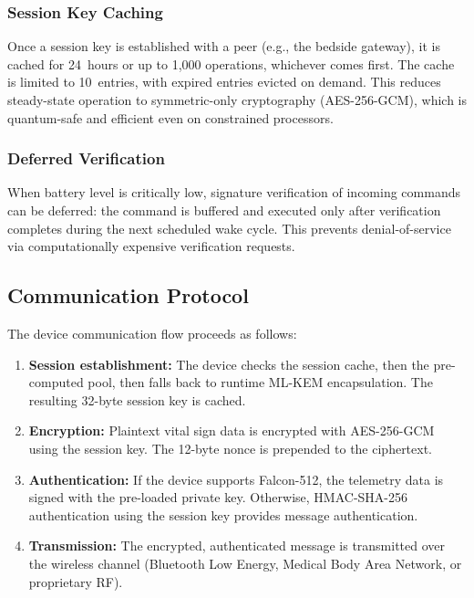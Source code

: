 \documentclass[conference,10pt]{IEEEtran}
\newcommand{\mlkem}{\textsf{ML-KEM}}
\newcommand{\aesgcm}{\textsf{AES-256-GCM}}
\begin{document}
\subsubsection{Session Key Caching}
Once a session key is established with a peer (e.g., the bedside gateway), it is cached for 24~hours or up to 1{,}000 operations, whichever comes first. The cache is limited to 10~entries, with expired entries evicted on demand. This reduces steady-state operation to symmetric-only cryptography (\aesgcm{}), which is quantum-safe and efficient even on constrained processors.

\subsubsection{Deferred Verification}
When battery level is critically low, signature verification of incoming commands can be deferred: the command is buffered and executed only after verification completes during the next scheduled wake cycle. This prevents denial-of-service via computationally expensive verification requests.

\subsection{Communication Protocol}

The device communication flow proceeds as follows:

\begin{enumerate}[leftmargin=*]
    \item \textbf{Session establishment:} The device checks the session cache, then the pre-computed pool, then falls back to runtime \mlkem{} encapsulation. The resulting 32-byte session key is cached.
    \item \textbf{Encryption:} Plaintext vital sign data is encrypted with \aesgcm{} using the session key. The 12-byte nonce is prepended to the ciphertext.
    \item \textbf{Authentication:} If the device supports Falcon-512, the telemetry data is signed with the pre-loaded private key. Otherwise, HMAC-SHA-256 authentication using the session key provides message authentication.
    \item \textbf{Transmission:} The encrypted, authenticated message is transmitted over the wireless channel (Bluetooth Low Energy, Medical Body Area Network, or proprietary RF).
\end{enumerate}

\end{document}
